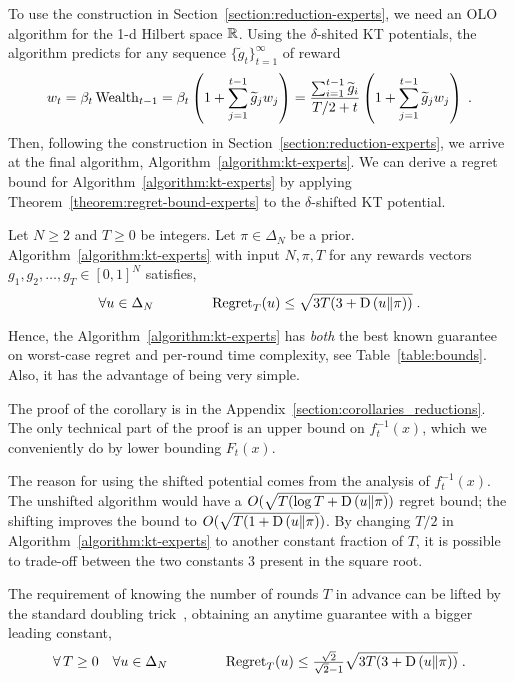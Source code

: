 To use the construction in Section~\ref{section:reduction-experts}, we need an
OLO algorithm for the 1-d Hilbert space $\mathbb{R}$.  Using the $\delta$-shited KT
potentials, the algorithm predicts for any sequence $\{\widetilde
g_t\}_{t=1}^\infty$ of reward
\[
w_t
= \beta_t \operatorname{Wealth}_{t-1}
= \beta_t \left(1 + \sum_{j=1}^{t-1} \widetilde g_j w_j \right)
= \frac{\sum_{i=1}^{t-1} \widetilde g_i}{T/2+t} \left(1 + \sum_{j=1}^{t-1} \widetilde g_j w_j \right) \; .
\]
Then, following the construction in Section~\ref{section:reduction-experts}, we
arrive at the final algorithm, Algorithm~\ref{algorithm:kt-experts}.
We can derive a regret bound for Algorithm~\ref{algorithm:kt-experts} by
applying Theorem~\ref{theorem:regret-bound-experts} to the $\delta$-shifted KT
potential.
%
\begin{corollary} \label{corollary:kt-experts-regret} Let
$N \ge 2$ and $T \ge 0$ be integers. Let $\pi \in \Delta_N$ be a prior.
Algorithm~\ref{algorithm:kt-experts} with input $N,\pi,T$
for any rewards vectors $g_1, g_2, \dots, g_T \in [0,1]^N$ satisfies,
\[
\forall u \in \Delta_N \qquad \qquad \operatorname{Regret}_T(u) \le \sqrt{3T (3 + \operatorname{D}\left({u}\middle\|{\pi}\right))} \; .
\]
\end{corollary}
%
Hence, the Algorithm~\ref{algorithm:kt-experts} has \emph{both} the best known
guarantee on worst-case regret and per-round time complexity, see
Table~\ref{table:bounds}. Also, it has the advantage of being very simple.

The proof of the corollary is in the
Appendix~\ref{section:corollaries_reductions}.  The only technical part of the proof
is an upper bound on $f_t^{-1}(x)$, which we conveniently do by lower bounding
$F_t(x)$.

The reason for using the shifted potential comes from the analysis of
$f_t^{-1}(x)$. The unshifted algorithm would have a $O(\sqrt{T (\log T +
\operatorname{D}\left({u}\middle\|{\pi}\right)})$ regret bound; the shifting improves the bound to $O(\sqrt{T (1 +
\operatorname{D}\left({u}\middle\|{\pi}\right)})$.  By changing $T/2$ in Algorithm~\ref{algorithm:kt-experts} to
another constant fraction of $T$, it is possible to trade-off between the two
constants $3$ present in the square root.

The requirement of knowing the number of rounds $T$ in advance can be lifted by
the standard doubling trick~\cite[Section 2.3.1]{Shalev-Shwartz-2011},
obtaining an anytime guarantee with a bigger leading constant,
\[
\forall \, T \ge 0 \quad \forall u \in \Delta_N \qquad \qquad
\operatorname{Regret}_T(u) \le \tfrac{\sqrt{2}}{\sqrt{2} - 1} \sqrt{3T (3 + \operatorname{D}\left({u}\middle\|{\pi}\right))} \; .
\]
